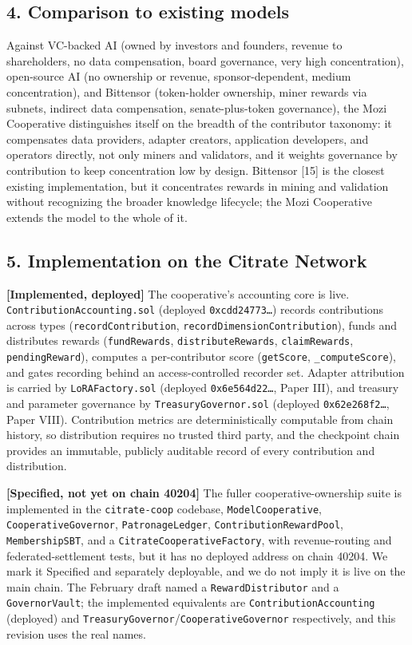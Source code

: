 \subsection{4. Comparison to existing
models}\label{comparison-to-existing-models}

Against VC-backed AI (owned by investors and founders, revenue to
shareholders, no data compensation, board governance, very high
concentration), open-source AI (no ownership or revenue,
sponsor-dependent, medium concentration), and Bittensor (token-holder
ownership, miner rewards via subnets, indirect data compensation,
senate-plus-token governance), the Mozi Cooperative distinguishes itself
on the breadth of the contributor taxonomy: it compensates data
providers, adapter creators, application developers, and operators
directly, not only miners and validators, and it weights governance by
contribution to keep concentration low by design. Bittensor {[}15{]} is
the closest existing implementation, but it concentrates rewards in
mining and validation without recognizing the broader knowledge
lifecycle; the Mozi Cooperative extends the model to the whole of it.

\subsection{5. Implementation on the Citrate
Network}\label{implementation-on-the-citrate-network}

\textbf{{[}Implemented, deployed{]}} The cooperative's accounting core
is live. \texttt{ContributionAccounting.sol} (deployed
\texttt{0xcdd24773…}) records contributions across types
(\texttt{recordContribution}, \texttt{recordDimensionContribution}),
funds and distributes rewards (\texttt{fundRewards},
\texttt{distributeRewards}, \texttt{claimRewards},
\texttt{pendingReward}), computes a per-contributor score
(\texttt{getScore}, \texttt{\_computeScore}), and gates recording behind
an access-controlled recorder set. Adapter attribution is carried by
\texttt{LoRAFactory.sol} (deployed \texttt{0x6e564d22…}, Paper III), and
treasury and parameter governance by \texttt{TreasuryGovernor.sol}
(deployed \texttt{0x62e268f2…}, Paper VIII). Contribution metrics are
deterministically computable from chain history, so distribution
requires no trusted third party, and the checkpoint chain provides an
immutable, publicly auditable record of every contribution and
distribution.

\textbf{{[}Specified, not yet on chain 40204{]}} The fuller
cooperative-ownership suite is implemented in the \texttt{citrate-coop}
codebase, \texttt{ModelCooperative}, \texttt{CooperativeGovernor},
\texttt{PatronageLedger}, \texttt{ContributionRewardPool},
\texttt{MembershipSBT}, and a \texttt{CitrateCooperativeFactory}, with
revenue-routing and federated-settlement tests, but it has no deployed
address on chain 40204. We mark it Specified and separately deployable,
and we do not imply it is live on the main chain. The February draft
named a \texttt{RewardDistributor} and a \texttt{GovernorVault}; the
implemented equivalents are \texttt{ContributionAccounting} (deployed)
and \texttt{TreasuryGovernor}/\texttt{CooperativeGovernor} respectively,
and this revision uses the real names.

